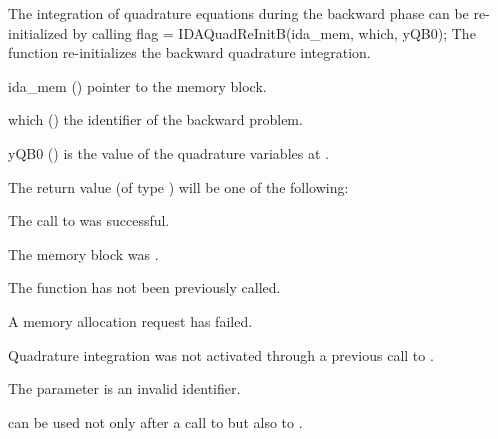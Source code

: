 The integration of quadrature equations during the backward phase can be
re-initialized by calling
{
  flag = IDAQuadReInitB(ida\_mem, which, yQB0);
}
{
  The function  re-initializes the backward quadrature integration.
}
{
  \begin{args}
  \item[ida\_mem] ()
    pointer to the {\idas} memory block.
  \item[which] ()
    the identifier of the backward problem.
  \item[yQB0] ()
    is the value of the quadrature variables at .
  \end{args}
}
{
  The return value  (of type ) will be one of the following:
  \begin{args}
  \item[\Id{IDA\_SUCCESS}]
    The call to  was successful.
 \item[\Id{IDA\_MEM\_NULL}] 
    The  memory block was .
  \item[\Id{IDA\_NO\_ADJ}]
    The function  has not been previously called.
  \item[\Id{IDA\_MEM\_FAIL}] 
    A memory allocation request has failed.
  \item[\Id{IDA\_NO\_QUAD}] 
    Quadrature integration was not activated through a  previous 
    call to .
  \item[\Id{IDA\_ILL\_INPUT}]
    The parameter  is an invalid identifier.
  \end{args}
}
{
   can be used not only after a call to  but
  also to .
}

